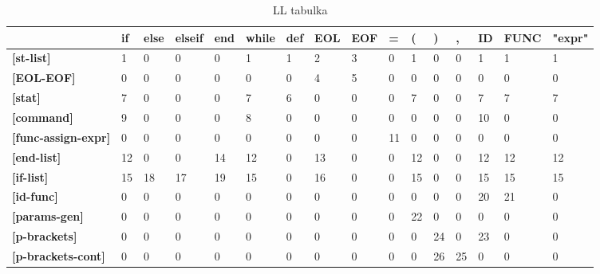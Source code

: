 \documentclass[11pt, a4paper]{article}
\begin{document}
\begin{table}[]
\setlength{\tabcolsep}{4pt}
\centering
{}
\begin{tabular}{l|l|l|l|l|l|l|l|l|l|l|l|l|l|l|l}
                       & \textbf{if} & \textbf{else} & \textbf{elseif} & \textbf{end} & \textbf{while} & \textbf{def} & \textbf{EOL} & \textbf{EOF} & \textbf{=}  & \textbf{(}  & \textbf{)}  & \textbf{,}  & \textbf{ID} & \textbf{FUNC} & \textbf{"expr"} \\\hline
\textbf{{[}st-list{]} }         & 1  & 0    & 0     & 0   & 1     & 1   & 2   & 3   & 0  & 1  & 0  & 0  & 1  & 1    & 1      \\\hline
\textbf{{[}EOL-EOF{]}}          & 0  & 0    & 0     & 0   & 0     & 0   & 4   & 5   & 0  & 0  & 0  & 0  & 0  & 0    & 0      \\\hline
\textbf{{[}stat{]}}             & 7  & 0    & 0     & 0   & 7     & 6   & 0   & 0   & 0  & 7  & 0  & 0  & 7  & 7    & 7      \\\hline
\textbf{{[}command{]} }         & 9  & 0    & 0     & 0   & 8     & 0   & 0   & 0   & 0  & 0  & 0  & 0  & 10 & 0    & 0      \\\hline
\textbf{{[}func-assign-expr{]}} & 0  & 0    & 0     & 0   & 0     & 0   & 0   & 0   & 11 & 0  & 0  & 0  & 0  & 0    & 0      \\\hline
\textbf{{[}end-list{]} }        & 12 & 0    & 0     & 14  & 12    & 0   & 13  & 0   & 0  & 12 & 0  & 0  & 12 & 12   & 12     \\\hline
\textbf{{[}if-list{]}}          & 15 & 18   & 17    & 19  & 15    & 0   & 16  & 0   & 0  & 15 & 0  & 0  & 15 & 15   & 15     \\\hline
\textbf{{[}id-func{]}}          & 0  & 0    & 0     & 0   & 0     & 0   & 0   & 0   & 0  & 0  & 0  & 0  & 20 & 21   & 0      \\\hline
\textbf{{[}params-gen{]}}       & 0  & 0    & 0     & 0   & 0     & 0   & 0   & 0   & 0  & 22 & 0  & 0  & 0  & 0    & 0      \\\hline
\textbf{{[}p-brackets{]}}       & 0  & 0    & 0     & 0   & 0     & 0   & 0   & 0   & 0  & 0  & 24 & 0  & 23 & 0    & 0      \\\hline
\textbf{{[}p-brackets-cont{]}}  & 0  & 0    & 0     & 0   & 0     & 0   & 0   & 0   & 0  & 0  & 26 & 25 & 0  & 0    & 0     
\end{tabular}
\label{tab:2}
\caption{LL tabulka}
\end{table}
\end{document}
